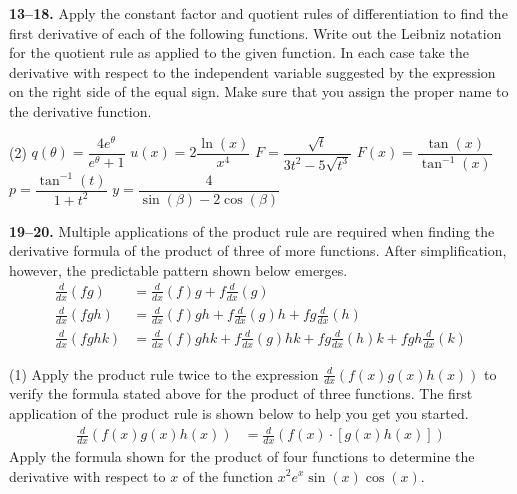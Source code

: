 \documentclass[10pt,oneside,]{book}
\theoremstyle{plain}
\theoremstyle{definition}
\numberwithin{equation}{section}
\newcommand{\fe}[2]{#1\mathopen{}\left(#2\right)\mathclose{}}
\newcommand{\lzoo}[2]{{\frac{d}{d#1}}{\left(#2\right)}}
\begin{document}
\par\smallskip\noindent
\textbf{13--18. }\hypertarget{exercisegroup-86}{\null}Apply the constant factor and quotient rules of differentiation to find the first derivative of each of the following functions.   Write out the Leibniz notation for the quotient rule as applied to the given function. In each case take the derivative with respect to the independent variable suggested by the expression on the right side of the equal sign.  Make sure that you assign the proper name to the derivative function.%
\par
\begin{exercisegroup}(2)
\exercise[13.]\hypertarget{exercise-414}{\null}\(\fe{q}{\theta}=\dfrac{4e^{\theta}}{e^\theta+1}\)%
\exercise[14.]\hypertarget{exercise-415}{\null}\(\fe{u}{x}=2\dfrac{\fe{\ln}{x}}{x^4}\)%
\exercise[15.]\hypertarget{exercise-416}{\null}\(F=\dfrac{\sqrt{t}}{3t^2-5\sqrt{t^3}}\)%
\exercise[16.]\hypertarget{exercise-417}{\null}\(\fe{F}{x}=\dfrac{\fe{\tan}{x}}{\fe{\tan^{-1}}{x}}\)%
\exercise[17.]\hypertarget{exercise-418}{\null}\(p=\dfrac{\fe{\tan^{-1}}{t}}{1+t^2}\)%
\exercise[18.]\hypertarget{exercise-419}{\null}\(y=\dfrac{4}{\fe{\sin}{\beta}-2\fe{\cos}{\beta}}\)%
\end{exercisegroup}
\par\smallskip\noindent
\textbf{19--20. }\hypertarget{exercisegroup-87}{\null}Multiple applications of the product rule are required when finding the derivative formula of the product of three of more functions.  After simplification, however, the predictable pattern shown below emerges.\begin{align*}
\lzoo{x}{fg}&=\lzoo{x}{f}g+f\lzoo{x}{g}\\
\lzoo{x}{fgh}&=\lzoo{x}{f}gh+f\lzoo{x}{g}h+fg\lzoo{x}{h}\\
\lzoo{x}{fghk}&=\lzoo{x}{f}ghk+f\lzoo{x}{g}hk+fg\lzoo{x}{h}k+fgh\lzoo{x}{k}
\end{align*}%
\par
\begin{exercisegroup}(1)
\exercise[19.]\hypertarget{exercise-420}{\null}Apply the product rule twice to the expression \(\lzoo{x}{\fe{f}{x}\fe{g}{x}\fe{h}{x}}\)  to verify the 
formula stated above for the product of three functions.  The first application of the product rule is shown below to help you get you started.\begin{align*}
\lzoo{x}{\fe{f}{x}\fe{g}{x}\fe{h}{x}}&=\lzoo{x}{\fe{f}{x}\cdot\left[\fe{g}{x}\fe{h}{x}\right]}
\end{align*}%
\exercise[20.]\hypertarget{exercise-421}{\null}Apply the formula shown for the product of four functions to determine the derivative with respect to \(x\) of the function \(x^2e^x\fe{\sin}{x}\fe{\cos}{x}\).%
\end{exercisegroup}
\end{document}
